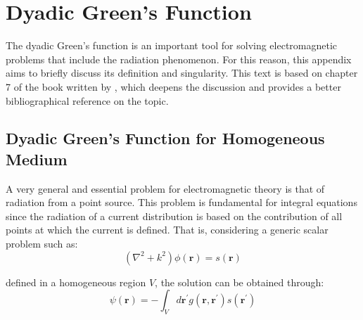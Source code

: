 	\chapter{Dyadic Green's Function}\label{app:green}
	
		The dyadic Green's function is an important tool for solving electromagnetic problems that include the radiation phenomenon. For this reason, this appendix aims to briefly discuss its definition and singularity. This text is based on chapter 7 of the book written by \cite{chew1995}, which deepens the discussion and provides a better bibliographical reference on the topic.

		\section{Dyadic Green's Function for Homogeneous Medium}\label{app:green:1}

			A very general and essential problem for electromagnetic theory is that of radiation from a point source. This problem is fundamental for integral equations since the radiation of a current distribution is based on the contribution of all points at which the current is defined. That is, considering a generic scalar problem such as:
			\begin{equation}
				(\nabla^2+k^2)\phi(\mathbf{r}) = s(\mathbf{r}) \label{eq:app:green:1}
			\end{equation}

			\noindent defined in a homogeneous region $V$, the solution can be obtained through:
			\begin{equation}
				\psi(\mathbf{r}) = - \int_V d\mathbf{r^\prime} g(\mathbf{r}, \mathbf{r^\prime})s(\mathbf{r^\prime}) \label{eq:app:green:2}
			\end{equation}

